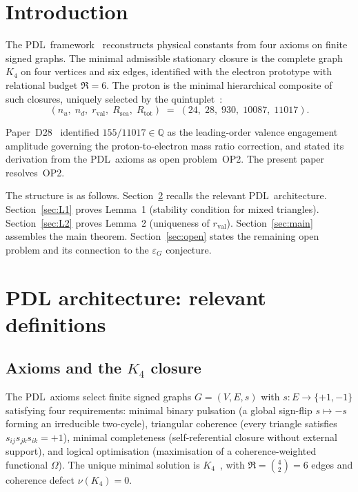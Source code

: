 \documentclass[11pt,a4paper]{article}
\theoremstyle{definition}
\newcommand{\PDL}{\textnormal{PDL}}
\newcommand{\Rsea}{R_{\mathrm{sea}}}
\newcommand{\Rtot}{R_{\mathrm{tot}}}
\newcommand{\rval}{r_{\mathrm{val}}}
\newcommand{\epsg}{\varepsilon_G}
\newcommand{\Kfour}{K_4}
\begin{document}
\newpage
\tableofcontents

\section{Introduction}
\label{sec:intro}

The \PDL\ framework~\cite{PDL_Main_2026,PDL_Intro_2026} reconstructs physical constants from four axioms on finite signed graphs. The minimal admissible stationary closure is the complete graph $\Kfour$ on four vertices and six edges, identified with the electron prototype with relational budget $\Re = 6$. The proton is the minimal hierarchical composite of such closures, uniquely selected by the quintuplet~\cite{Combinatorial_Proton_v2_2026}:
\begin{equation}
\label{eq:quintuplet}
(n_u,\; n_d,\; \rval,\; \Rsea,\; \Rtot) \;=\; (24,\; 28,\; 930,\; 10087,\; 11017).
\end{equation}

Paper~D28~\cite{PDL_D28_2026} identified $155/11017 \in \mathbb{Q}$ as the leading-order valence engagement amplitude governing the proton-to-electron mass ratio correction, and stated its derivation from the \PDL\ axioms as open problem~OP2. The present paper resolves~OP2.

The structure is as follows. Section~\ref{sec:architecture} recalls the relevant \PDL\ architecture. Section~\ref{sec:L1} proves Lemma~1 (stability condition for mixed triangles). Section~\ref{sec:L2} proves Lemma~2 (uniqueness of $\rval$). Section~\ref{sec:main} assembles the main theorem. Section~\ref{sec:open} states the remaining open problem and its connection to the $\epsg$ conjecture.

\section{PDL architecture: relevant definitions}
\label{sec:architecture}

\subsection{Axioms and the \texorpdfstring{$\Kfour$}{K4} closure}

The \PDL\ axioms select finite signed graphs $G = (V, E, s)$ with $s : E \to \{+1, -1\}$ satisfying four requirements: minimal binary pulsation (a global sign-flip $s \mapsto -s$ forming an irreducible two-cycle), triangular coherence (every triangle satisfies $s_{ij}s_{jk}s_{ik} = +1$), minimal completeness (self-referential closure without external support), and logical optimisation (maximisation of a coherence-weighted functional $\Omega$). The unique minimal solution is $\Kfour$~\cite{PDL_Main_2026,Minimal_Closures_PDL_2026}, with $\Re = \binom{4}{2} = 6$ edges and coherence defect $\nu(\Kfour) = 0$.
\end{document}
